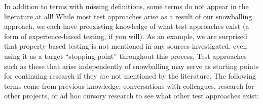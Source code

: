 \ifnotpaper
    
\fi

\label{missingTerms}
In addition to terms with missing definitions, some terms do not appear in
the literature at all! While most test approaches arise as a result of our
snowballing approach, we each have preexisting knowledge of what test
approaches exist (a form of experience-based testing, if you will).
As an example, we are surprised that property-based testing is not mentioned
in any sources investigated, even using it as a target ``stopping point''
throughout this process. Test approaches such as these that arise
independently of snowballing may serve as starting points for continuing
research if they are not mentioned by the literature. The following terms come
from previous knowledge, conversations with colleagues, research for other
projects, or ad hoc cursory research to see what other test approaches exist:
